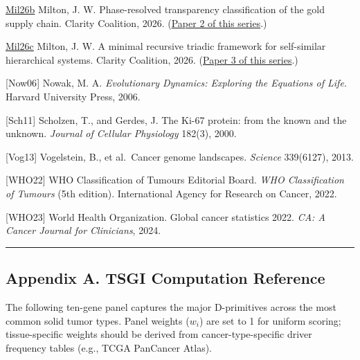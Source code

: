 \documentclass[12pt]{article}
\begin{document}
\href{https://github.com/baardev/truevalue/blob/main/docnav/Research/papers/2_supply-chain-transparency-tvpci/2_supply-chain-transparency-tvpci.pdf}{Mil26b}
Milton, J. W. Phase-resolved transparency classification of the gold
supply chain. Clarity Coalition, 2026.
(\href{https://github.com/baardev/truevalue/blob/main/docnav/Research/papers/2_supply-chain-transparency-tvpci/2_supply-chain-transparency-tvpci.pdf}{Paper
2 of this series}.)

\href{https://github.com/baardev/truevalue/blob/main/docnav/Research/papers/3_minimal-recursive-triadic-framework/3_minimal-recursive-triadic-framework.pdf}{Mil26c}
Milton, J. W. A minimal recursive triadic framework for self-similar
hierarchical systems. Clarity Coalition, 2026.
(\href{https://github.com/baardev/truevalue/blob/main/docnav/Research/papers/3_minimal-recursive-triadic-framework/3_minimal-recursive-triadic-framework.pdf}{Paper
3 of this series}.)

{[}Now06{]} Nowak, M. A. \emph{Evolutionary Dynamics: Exploring the
Equations of Life.} Harvard University Press, 2006.

{[}Sch11{]} Scholzen, T., and Gerdes, J. The Ki-67 protein: from the
known and the unknown. \emph{Journal of Cellular Physiology} 182(3),
2000.

{[}Vog13{]} Vogelstein, B., et al.~Cancer genome landscapes.
\emph{Science} 339(6127), 2013.

{[}WHO22{]} WHO Classification of Tumours Editorial Board. \emph{WHO
Classification of Tumours} (5th edition). International Agency for
Research on Cancer, 2022.

{[}WHO23{]} World Health Organization. Global cancer statistics 2022.
\emph{CA: A Cancer Journal for Clinicians}, 2024.

\begin{center}\rule{0.5\linewidth}{0.5pt}\end{center}

\subsection{Appendix A. TSGI Computation
Reference}\label{appendix-a.-tsgi-computation-reference}

The following ten-gene panel captures the major D-primitives across the
most common solid tumor types. Panel weights (\(w_i\)) are set to 1 for
uniform scoring; tissue-specific weights should be derived from
cancer-type-specific driver frequency tables (e.g., TCGA PanCancer
Atlas).
\end{document}
